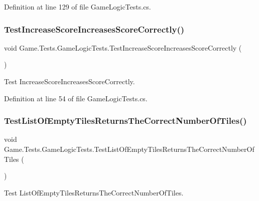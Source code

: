 Definition at line 129 of file Game\+Logic\+Tests.\+cs.

\mbox{\label{class_game_1_1_tests_1_1_game_logic_tests_aff90c0279e1df2707165537b92c63e43}} 
\subsubsection{\texorpdfstring{TestIncreaseScoreIncreasesScoreCorrectly()}{TestIncreaseScoreIncreasesScoreCorrectly()}}
{\footnotesize\ttfamily void Game.\+Tests.\+Game\+Logic\+Tests.\+Test\+Increase\+Score\+Increases\+Score\+Correctly (\begin{DoxyParamCaption}{ }\end{DoxyParamCaption})}



Test Increase\+Score\+Increases\+Score\+Correctly. 



Definition at line 54 of file Game\+Logic\+Tests.\+cs.

\mbox{\label{class_game_1_1_tests_1_1_game_logic_tests_ac5b9e8c3adf167540ab6f5483f92ff82}} 
\subsubsection{\texorpdfstring{TestListOfEmptyTilesReturnsTheCorrectNumberOfTiles()}{TestListOfEmptyTilesReturnsTheCorrectNumberOfTiles()}}
{\footnotesize\ttfamily void Game.\+Tests.\+Game\+Logic\+Tests.\+Test\+List\+Of\+Empty\+Tiles\+Returns\+The\+Correct\+Number\+Of\+Tiles (\begin{DoxyParamCaption}{ }\end{DoxyParamCaption})}



Test List\+Of\+Empty\+Tiles\+Returns\+The\+Correct\+Number\+Of\+Tiles. 



